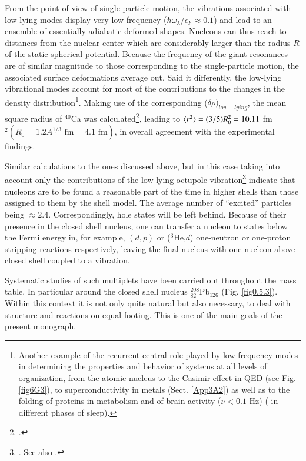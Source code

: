 From the point of view of  single-particle motion, the vibrations associated with low-lying modes display very low frequency ($\hbar\omega_\lambda/\epsilon_F\approx0.1$) and lead to an ensemble of essentially adiabatic deformed shapes. Nucleons can thus reach to distances from the nuclear center which are considerably larger than the radius $R$ of the static spherical potential. Because the frequency of the giant resonances are of similar magnitude to those corresponding to the single-particle motion, the associated surface deformations average out. 
Said it differently,  the low-lying vibrational modes  account for most of the contributions to the changes in the density distribution\footnote{\label{f52C1} Another example of the  recurrent central role played by low-frequency modes in determining the properties and behavior of systems at all levels of organization, from the atomic nucleus to the Casimir effect in QED (see Fig. \ref{fig6G3}), to  superconductivity in metals (Sect. \ref{App3A2}) as well as  to the folding of proteins in metabolism and of brain  activity ($\nu<0.1$ Hz) (\cite{Mitra:18,Vyazovskiy:13} in different phases of sleep).}. Making use of the corresponding ($\delta\rho)_{low-lying}$, the mean square radius of $^{40}$Ca was calculated\footnote{\cite{Barranco:87a}.}, leading to $\langle {r^2} \rangle=(3/5)R_0^2=10.11$ fm$^2 (R_0=1.2A^{1/3}\text{ fm}=4.1\text{ fm})$, in overall agreement with the experimental findings. 

Similar calculations to the ones discussed above, but in this case taking into account only the contributions of the low-lying octupole vibration\footnote{\cite{Brown:63}. See also \cite{Anderson:62}.} indicate that nucleons are to be found a reasonable part of the time in higher shells than those assigned to them by the shell model. The average number of ``excited'' particles being $\approx2.4$. 
Correspondingly, hole states will be left behind. Because of their presence  in the closed shell nucleus, one can transfer a nucleon to states below the Fermi energy in, for example, $(d,p)$ or ($^3$He,$d$) one-neutron or one-proton stripping reactions respectively, leaving the final nucleus with one-nucleon above closed shell coupled to a vibration.


Systematic studies of such multiplets have been carried out throughout the mass table. In particular around the closed shell nucleus $^{208}_{82}$Pb$_{126}$ (Fig. \ref{fig0.5.3}). Within this context it is not only  quite natural but also necessary, to deal with structure and reactions on equal footing.  This is one of the main goals of the present monograph. 
